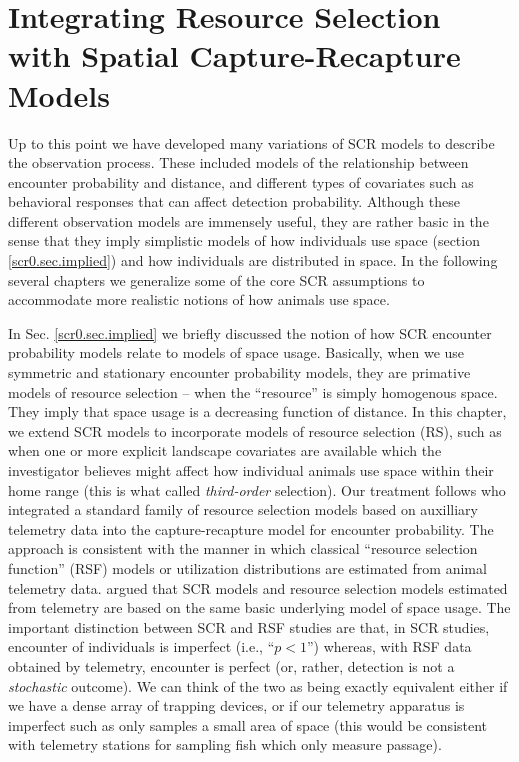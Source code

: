 \chapter{
Integrating Resource Selection with
Spatial Capture-Recapture
  Models}

\label{chapt.rsf}


\vspace{.3in}

Up to this point we have developed many variations of SCR models to
describe the observation process.  These included models of the
relationship between encounter probability and distance, and different
types of covariates such as behavioral responses that can affect
detection probability.  Although these different observation models
are immensely useful, they are rather basic in the sense that they
imply simplistic models of how individuals use space (section
\ref{scr0.sec.implied}) and how individuals are distributed in space.
In the following several chapters we generalize some of the core SCR
assumptions to accommodate more realistic notions of how animals use
space.  



In Sec. \ref{scr0.sec.implied}
we briefly discussed the notion of how SCR encounter probability
models relate to models of space usage.
Basically, when we use symmetric and
stationary encounter probability models, they are primative models of resource
selection -- when the ``resource'' is simply homogenous space. They
imply that space usage is a decreasing function of distance.  In this chapter,
we extend SCR models to incorporate models of resource selection (RS),
such as when one or more explicit landscape covariates are available
which the investigator believes might affect how individual animals
use space within their home range (this is what \citep{johnson:1980}
called {\it third-order} selection).  Our treatment follows
\citet{royle_etal:2012mee} who integrated a standard family of
resource selection models based on auxilliary telemetry data into the
capture-recapture model for encounter probability.  The approach is
consistent with the manner in which classical ``resource selection
function'' (RSF) models \citep{manly_etal:2002} or utilization
distributions \citep{worton:1989, fieberg:2005, fieberg:2007} are
estimated from animal telemetry data.  \citet{royle_etal:2012mee}
argued that SCR models and resource selection models estimated from
telemetry are based on the same basic underlying model of space
usage. The important distinction between SCR and RSF studies are that,
in SCR studies, encounter of individuals is imperfect (i.e.,
``$p<1$'') whereas, with RSF data obtained by telemetry, encounter is
perfect (or, rather, detection is not a {\it stochastic} outcome). We
can think of the two as being exactly equivalent either if we have a
dense array of trapping devices, or if our telemetry apparatus is
imperfect such as only samples a small area of space (this would be
consistent with telemetry stations for sampling fish which only
measure passage).



